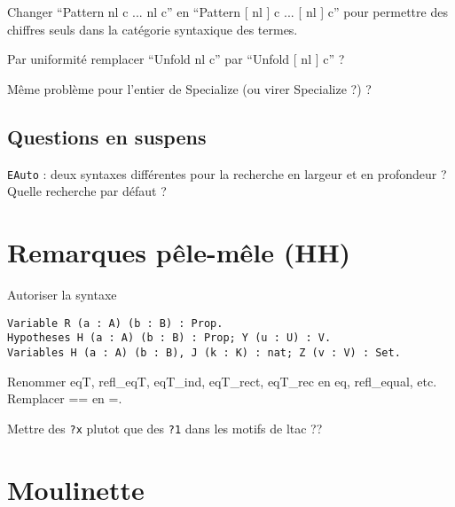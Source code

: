 \documentclass{article}
\begin{document}
Changer ``Pattern nl c ... nl c'' en ``Pattern [ nl ] c ... [ nl ] c''
pour permettre des chiffres seuls dans la catégorie syntaxique des
termes.

Par uniformité remplacer ``Unfold nl c'' par ``Unfold [ nl ] c'' ?

Même problème pour l'entier de Specialize (ou virer Specialize ?) ?

\subsection{Questions en suspens}

\verb=EAuto= : deux syntaxes différentes pour la recherche en largeur
et en profondeur ? Quelle recherche par défaut ?

\section*{Remarques pêle-mêle (HH)}

Autoriser la syntaxe

\begin{verbatim}
Variable R (a : A) (b : B) : Prop.
Hypotheses H (a : A) (b : B) : Prop; Y (u : U) : V.
Variables H (a : A) (b : B), J (k : K) : nat; Z (v : V) : Set.
\end{verbatim}

Renommer eqT, refl_eqT, eqT_ind, eqT_rect, eqT_rec en eq, refl_equal, etc.
Remplacer == en =.

Mettre des \verb=?x= plutot que des \verb=?1= dans les motifs de ltac ??

\section{Moulinette}
\end{document}
